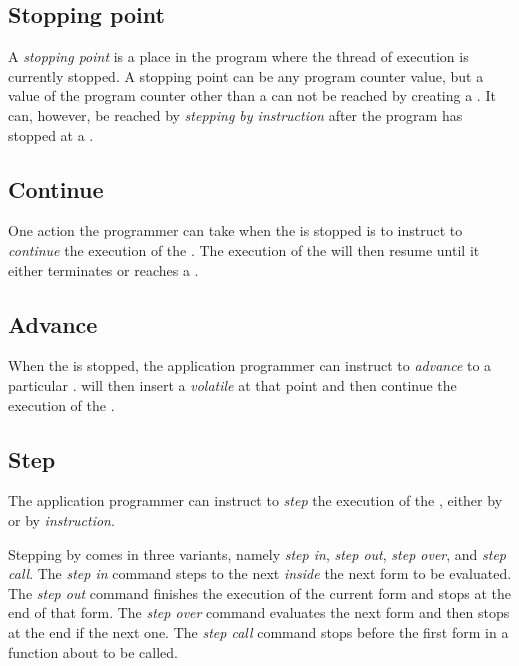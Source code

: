 %
\def\Stoppingpoint{Stopping point}%
\def\stoppingpoint{stopping point}%
\def\stoppingpoints{stopping points}%
\subsection{\Stoppingpoint{}}

A \emph{\stoppingpoint{}} is a place in the program where the thread
of execution is currently stopped.  A \stoppingpoint{} can be any
program counter value, but a value of the program counter other than
a \pollpoint{} can not be reached by creating a \breakpoint{}.  It
can, however, be reached by \emph{stepping by instruction} after the
program has stopped at a \pollpoint{}.

%
\def\Continue{Continue}%
\def\continue{continue}%
\def\continues{continues}%
\subsection{\Continue{}}

One action the programmer can take when the \applicationthread{} is
stopped is to instruct \sysname{} to \emph{\continue{}} the execution
of the \applicationthread{}.  The execution of the
\applicationthread{} will then resume until it either terminates or
reaches a \breakpoint{}.

%
\def\Dvance{Advance}%
\def\dvance{advance}%
\def\dvances{advances}%
\subsection{\Dvance{}}

When the \applicationthread{} is stopped, the application programmer
can instruct \sysname{} to \emph{\dvance{}} to a particular
\pollpoint{}.  \sysname{} will then insert a \emph{volatile
  \breakpoint{}} at that point and then \continue{} the execution of
the \applicationthread{}.

%
\def\Step{Step}%
\def\step{step}%
\def\steps{steps}%
\subsection{\Step{}}

The application programmer can instruct \sysname{} to \emph{\step{}}
the execution of the \applicationthread{}, either by \emph{\pollpoint}
or by \emph{instruction}.  

Stepping by \pollpoint{} comes in three variants, namely \emph{\step{}
  in}, \emph{\step{} out}, \emph{\step{} over}, and \emph{\step{}
  call}.  The \emph{\step{} in} command steps to the next \pollpoint{}
\emph{inside} the next form to be evaluated.  The \emph{\step{} out}
command finishes the execution of the current form and stops at the
end of that form.  The \emph{\step{} over} command evaluates the next
form and then stops at the end if the next one.  The \emph{\step{}
  call} command stops before the first form in a function about to be
called.

